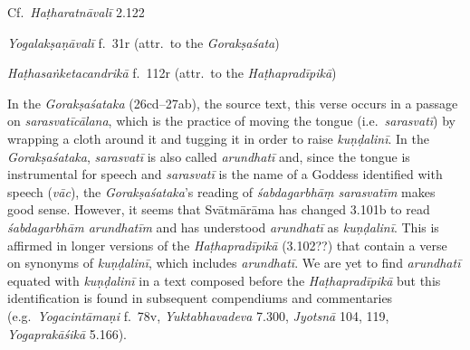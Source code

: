 \begin{ekdosis}
\begin{testimonia}[hp03_101]
Cf.~\emph{Haṭharatnāvalī} 2.122
\begin{versinnote}
\end{versinnote}

\emph{Yogalakṣaṇāvalī} f.~31r  (attr.~to the \emph{Gorakṣaśata})
\begin{versinnote}
\end{versinnote}

\emph{Haṭhasaṅketacandrikā} f.~112r (attr.~to the \emph{Haṭhapradīpikā})
\begin{versinnote}
\end{versinnote}

\end{testimonia}

\begin{philcomm}[hp03_101]
In the \emph{Gorakṣaśataka} (26cd–27ab), the source text, this verse occurs in a passage on \emph{sarasvatīcālana}, which is the practice of moving the tongue (i.e.~\emph{sarasvatī}) by wrapping a cloth  around it and tugging it in order to raise \emph{kuṇḍalinī}. In the \emph{Gorakṣaśataka}, \emph{sarasvatī} is also called \emph{arundhatī} and, since the tongue is instrumental for speech and \emph{sarasvatī} is the name of a Goddess identified with speech (\emph{vāc}), the \emph{Gorakṣaśataka}'s reading of \emph{śabdagarbhāṃ sarasvatīm} makes good sense. However, it seems that Svātmārāma has changed 3.101b to read \emph{śabdagarbhām arundhatīm} and has understood \emph{arundhatī} as \emph{kuṇḍalinī}. This is affirmed in longer versions of the \emph{Haṭhapradīpikā} (3.102??) that contain a verse on synonyms of \emph{kuṇḍalinī}, which includes \emph{arundhatī}. We are yet to find \emph{arundhatī} equated with  \emph{kuṇḍalinī} in a text composed before the \emph{Haṭhapradīpikā} but this identification is found in subsequent compendiums and commentaries (e.g.~\emph{Yogacintāmaṇi} f.~78v, \emph{Yuktabhavadeva} 7.300, \emph{Jyotsnā} 104, 119, \emph{Yogaprakāśikā} 5.166).%
\end{philcomm}



\end{ekdosis}
